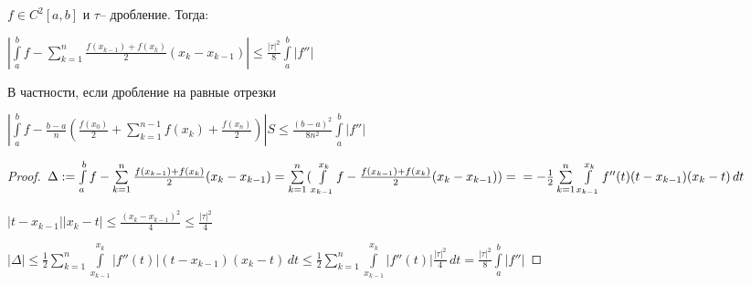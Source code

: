 \begin{theorem}\slashns
	
	$f \in C^2[a,b]$ и $\tau$-- дробление. Тогда:
	
	$\left|\int\limits_a^b f - \sum\limits_{k=1}^{n} \frac{f(x_{k-1}) + f(x_k)}{2} (x_k - x_{k-1})\right| \le \frac{\left|\tau\right|^2}{8} \int\limits_a^b \left| f''\right|$
	
	В частности, если дробление на равные отрезки
	
	$\left|\int\limits_a^b f - \frac{b-a}{n}(\frac{f(x_0)}{2} + \sum\limits_{k=1}^{n-1}f(x_k) + \frac{f(x_n)}{2})\right| S\le \frac{(b-a)^2}{8n^2} \int\limits_a^b \left|f''\right|$
\end{theorem}


\begin{proof}\slashns
	
	$\Delta:= \int\limits_a^b f - \sum\limits_{k=1}^{n} \frac{f(x_{k-1}) + f(x_k)}{2}(x_k - x_{k-1}) = \sum\limits_{k=1}^{n}(\int\limits_{x_{k-1}}^{x_k} f - \frac{f(x_{k-1}) + f(x_k)}{2} (x_k - x_{k-1})) =\\= -\frac12 \sum\limits_{k=1}^n \int\limits_{x_{k-1}}^{x_k} f''(t)(t-x_{k-1})(x_k - t) \, dt $
	
	$\left|t-x_{k-1}\right|\left|x_{k}-t\right|\le \frac{(x_k - x_{k - 1})^2}{4}\le \frac{\left|\tau\right|^2}{4}$
	
	$\left|\Delta\right| \le \frac12 \sum\limits_{k=1}^n \int\limits_{x_{k-1}}^{x_k} \left|f''(t)\right|(t - x_{k-1})(x_k - t) \, dt \le \frac12 \sum\limits_{k=1}^n \int\limits_{x_{k-1}}^{x_k} \left|f''(t)\right|\frac{\left|\tau\right|^2}{4} \, dt = \frac{\left|\tau\right|^2}{8} \int\limits_a^b \left|f''\right|$
		
\end{proof}

